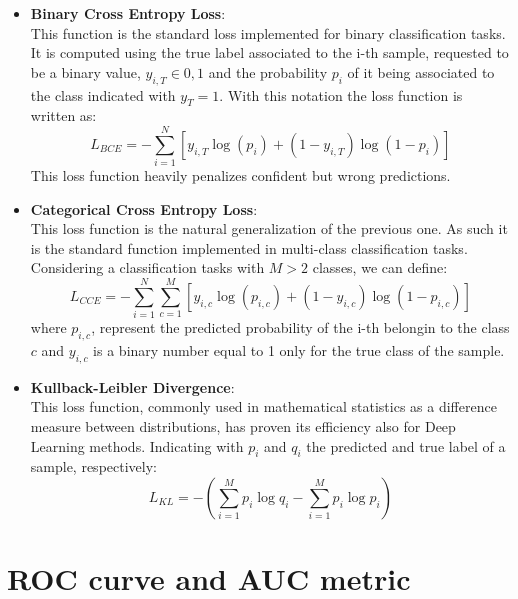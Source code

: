 \documentclass[../../main.tex]{subfiles}
\begin{document}
\begin{itemize}
\begin{equation}
    \end{equation}
\item \textbf{Binary Cross Entropy Loss}:\\
    This function is the standard loss implemented for binary classification tasks. It is computed using the true label associated to the i-th sample, requested to be a binary value, $y_{i,T}\in{0,1}$ and the probability $p_{i}$ of it being associated to the class indicated with $y_{T}=1$. With this notation the loss function is written as:
    \begin{equation}
        L_{BCE}= -\sum_{i=1}^N\left[ y_{i,T}\log(p_i)+
        \left(1- y_{i,T}\right)\log(1-p_i)\right]
    \end{equation}
    This loss function heavily penalizes confident but wrong predictions. 
\item \textbf{Categorical Cross Entropy Loss}:\\
    This loss function is the natural generalization of the previous one. As such it is the standard function implemented in multi-class classification tasks. Considering a classification tasks with $M>2$ classes, we can define: 
    \begin{equation}
        L_{CCE} = -\sum_{i=1}^N \sum_{c=1}^M  \left[
        y_{i,c}\log(p_{i,c}) + (1-y_{i,c})\log(1-p_{i,c})
        \right]
    \end{equation}
    where $p_{i,c}$, represent the predicted probability of the i-th belongin to the class $c$ and $y_{i,c}$ is a binary number equal to 1 only for the true class of the sample.
\item \textbf{Kullback-Leibler Divergence}:\\
   This loss function, commonly used in mathematical statistics as a difference measure between distributions, has proven its efficiency also for Deep Learning methods\cite{kullbackeff, kullbackeff2}. Indicating with $p_i$ and $q_i$ the predicted and true label of a sample, respectively:
    \begin{equation}
        L_{KL} = - \left( \sum_{i=1}^{M} p_{i} \log{q_{i}} - \sum_{i=1}^{M} p_{i} \log{p_{i}} \right)
    \end{equation}
    
\end{itemize}

\section{ROC curve and AUC metric}
\label{sec:roc}
\end{document}
